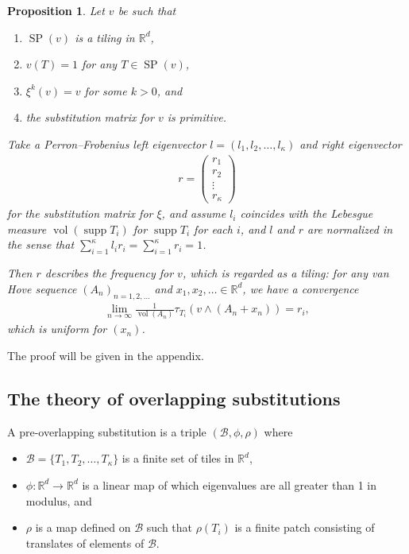 \documentclass[a4]{amsart}
\DeclareMathOperator{\supp}{supp}
\DeclareMathOperator{\vol}{vol}
\DeclareMathOperator{\SP}{SP}
\newcommand{\sci}{\wedge}
\newtheorem{prop}[theorem]{Proposition}
\theoremstyle{definition}
\begin{document}
\begin{prop}\label{prop_frequency_weighted-substi}
 Let $v$ be such that
\begin{enumerate}
\item $\SP(v)$ is a tiling in $\mathbb{R}^d$,
 \item $v(T)=1$ for any $T\in\SP(v)$,
\item $\xi^k(v)=v$ for some $k>0$, and
\item the substitution matrix for $v$ is primitive.
\end{enumerate}
Take a Perron--Frobenius left eigenvector $l=(l_1,l_2,\ldots ,l_{\kappa})$ and
right eigenvector
\begin{align*}
 r=
\begin{pmatrix}
 r_1\\r_2\\\vdots\\r_{\kappa}
\end{pmatrix}
\end{align*}
for the substitution matrix for $\xi$, 
and assume $l_i$ coincides with the Lebesgue measure $\vol(\supp T_i)$
for $\supp T_i$ for each $i$, and
$l$ and $r$ are normalized in the sense that $\sum_{i=1}^{\kappa}l_ir_i=\sum_{i=1}^{\kappa}r_i=1$.

Then $r$ describes the frequency for $v$, which is regarded as a tiling: for any van Hove sequence 
$(A_n)_{n=1,2,\ldots}$ and $x_1,x_2,\ldots\in\mathbb{R}^d$, we have a convergence
\begin{align*}
 \lim_{n\rightarrow \infty}\frac{1}{\vol(A_n)}\tau_{T_i}(v\sci (A_n+x_n))=r_i,
\end{align*}
which is uniform for $(x_n)$.
\end{prop}
The proof will be given in the appendix.







\subsection{The theory of overlapping substitutions}
A pre-overlapping substitution is a triple $(\mathcal{B},\phi,\rho)$ where
\begin{itemize}
\item $\mathcal{B}=\{T_1,T_2,\ldots ,T_{\kappa}\}$ is a finite set of tiles in $\mathbb{R}^d$,
\item $\phi\colon\mathbb{R}^d\rightarrow\mathbb{R}^d$ is a linear map of which eigenvalues are all greater than 1 in modulus, and
\item $\rho$ is a map defined on $\mathcal{B}$ such that $\rho(T_i)$ is a finite patch consisting of
translates of elements of $\mathcal{B}$.
\end{itemize}
\end{document}
